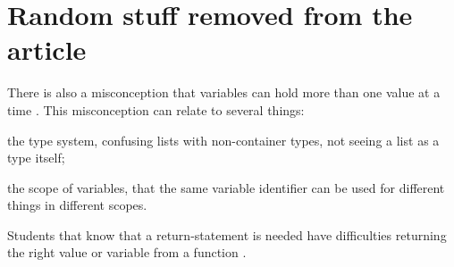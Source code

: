 \documentclass[onecolumn]{article}
\begin{document}
\section{Random stuff removed from the article}

There is also a misconception that variables can hold more than one value 
at a time \parencite{Doukakis2007}.
This misconception can relate to several things:
\begin{enumerate*}
  \item the type system, confusing lists with non-container types, not 
seeing a 
    list as a type itself;
  \item the scope of variables, that the same variable identifier can be 
used 
    for different things in different scopes.
\end{enumerate*}

Students that know that a return-statement is needed have difficulties 
returning the right value or variable from a function
\parencite{KumarVeerasamy2016}. 
\end{document}
